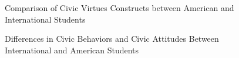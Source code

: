 \documentclass[
  man,
  floatsintext,
  longtable,
  nolmodern,
  notxfonts,
  notimes,
  colorlinks=true,linkcolor=blue,citecolor=blue,urlcolor=blue]{apa7}
\begin{document}
\begin{figure}

\caption{\label{fig-t-test-viz}Comparison of Civic Virtues Constructs
between American and International Students}


\end{figure}%

\begin{figure}

\caption{\label{fig-civic-behaviors-attitudes}Differences in Civic
Behaviors and Civic Attitudes Between International and American
Students}


\end{figure}%
\end{document}
